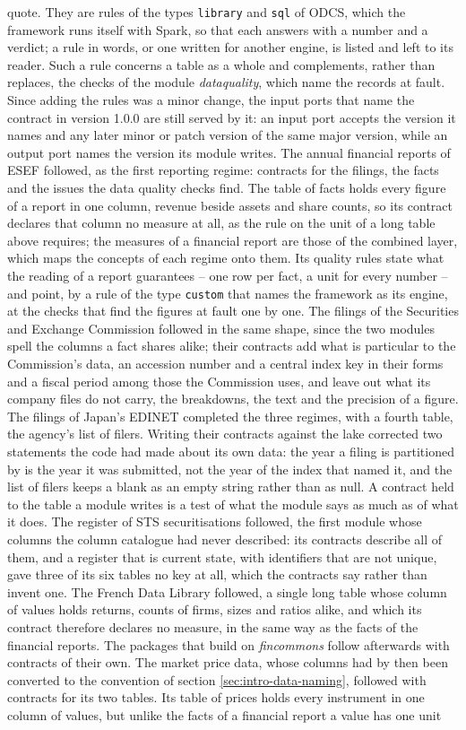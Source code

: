 \documentclass[a4paper, 11pt]{report}
\begin{document}
quote. They are rules of the types \verb|library| and \verb|sql| of ODCS, which the framework runs itself with Spark, so that each answers with a number and a verdict; a rule in words, or one written for another engine, is listed and left to its reader. Such a rule concerns a table as a whole and complements, rather than replaces, the checks of the module \emph{dataquality}, which name the records at fault. Since adding the rules was a minor change, the input ports that name the contract in version 1.0.0 are still served by it: an input port accepts the version it names and any later minor or patch version of the same major version, while an output port names the version its module writes. The annual financial reports of ESEF followed, as the first reporting regime: contracts for the filings, the facts and the issues the data quality checks find. The table of facts holds every figure of a report in one column, revenue beside assets and share counts, so its contract declares that column no measure at all, as the rule on the unit of a long table above requires; the measures of a financial report are those of the combined layer, which maps the concepts of each regime onto them. Its quality rules state what the reading of a report guarantees -- one row per fact, a unit for every number -- and point, by a rule of the type \verb|custom| that names the framework as its engine, at the checks that find the figures at fault one by one. The filings of the Securities and Exchange Commission followed in the same shape, since the two modules spell the columns a fact shares alike; their contracts add what is particular to the Commission's data, an accession number and a central index key in their forms and a fiscal period among those the Commission uses, and leave out what its company files do not carry, the breakdowns, the text and the precision of a figure. The filings of Japan's EDINET completed the three regimes, with a fourth table, the agency's list of filers. Writing their contracts against the lake corrected two statements the code had made about its own data: the year a filing is partitioned by is the year it was submitted, not the year of the index that named it, and the list of filers keeps a blank as an empty string rather than as null. A contract held to the table a module writes is a test of what the module says as much as of what it does. The register of STS securitisations followed, the first module whose columns the column catalogue had never described: its contracts describe all of them, and a register that is current state, with identifiers that are not unique, gave three of its six tables no key at all, which the contracts say rather than invent one. The French Data Library followed, a single long table whose column of values holds returns, counts of firms, sizes and ratios alike, and which its contract therefore declares no measure, in the same way as the facts of the financial reports. The packages that build on \emph{fincommons} follow afterwards with contracts of their own. The market price data, whose columns had by then been converted to the convention of section \ref{sec:intro-data-naming}, followed with contracts for its two tables. Its table of prices holds every instrument in one column of values, but unlike the facts of a financial report a value has one unit 
\end{document}
